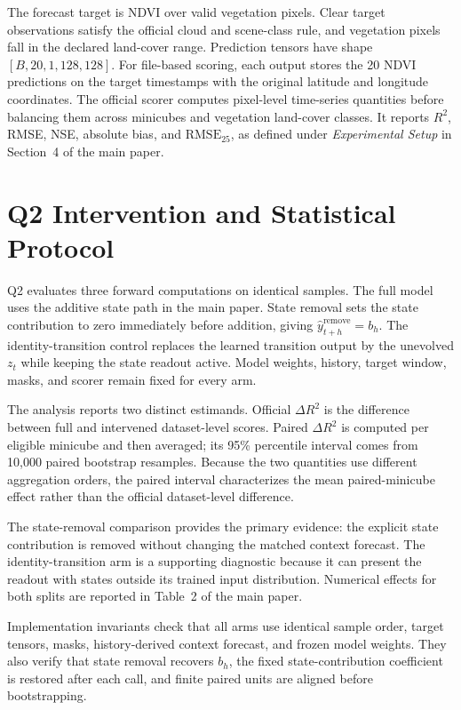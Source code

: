 \documentclass[letterpaper]{article}
\begin{document}
The forecast target is NDVI over valid vegetation pixels. Clear target
observations satisfy the official cloud and scene-class rule, and vegetation
pixels fall in the declared land-cover range. Prediction tensors have shape
\([B,20,1,128,128]\). For file-based scoring, each output stores the 20 NDVI
predictions on the target timestamps with the original latitude and longitude
coordinates. The official scorer computes pixel-level time-series quantities
before balancing them across minicubes and vegetation land-cover classes. It
reports \(R^2\), RMSE, NSE, absolute bias, and \(\mathrm{RMSE}_{25}\), as
defined under \emph{Experimental Setup} in Section~4 of the main paper.

\section{Q2 Intervention and Statistical Protocol}
\label{sec:q2-results}

Q2 evaluates three forward computations on identical samples. The full model
uses the additive state path in the main paper. State removal sets the state
contribution to zero immediately before addition, giving
\(\widehat y^{\mathrm{remove}}_{t+h}=b_h\). The identity-transition control
replaces the learned transition output by the unevolved \(z_t\) while keeping
the state readout active. Model weights, history, target window, masks, and
scorer remain fixed for every arm.

The analysis reports two distinct estimands. Official
\(\Delta R^2\) is the difference between full and intervened dataset-level
scores. Paired \(\Delta R^2\) is computed per eligible minicube and then
averaged; its 95\% percentile interval comes from 10,000 paired bootstrap
resamples. Because the two quantities use different aggregation orders, the
paired interval characterizes the mean paired-minicube effect rather than the
official dataset-level difference.

The state-removal comparison provides the primary evidence: the explicit
state contribution is removed without changing the matched context forecast.
The identity-transition arm is a supporting diagnostic because it can present
the readout with states outside its trained input distribution. Numerical
effects for both splits are reported in Table~2 of the main paper.

Implementation invariants check that all arms use identical sample order,
target tensors, masks, history-derived context forecast, and frozen
model weights. They also verify that state removal recovers \(b_h\), the fixed
state-contribution coefficient is restored after each call, and finite paired
units are aligned before bootstrapping.
\end{document}
